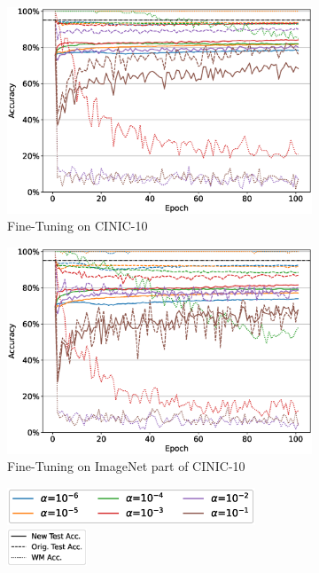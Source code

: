 \begin{figure}
\centering
\begin{subfigure}[b]{0.49\textwidth}
    \centering
    \includegraphics[width=\linewidth]{images/finetuning/finetuning_protecting_content_imagenet_0.eps}
    \caption{Fine-Tuning on CINIC-10}
\end{subfigure}
\begin{subfigure}[b]{0.49\textwidth}
    \centering
    \includegraphics[width=\linewidth]{images/finetuning/finetuning_protecting_content_imagenet_1.eps}
    \caption{Fine-Tuning on ImageNet part of CINIC-10}
\end{subfigure}

\begin{subfigure}[b]{\linewidth}
    \centering
    \includegraphics[height=1.1cm]{images/finetuning/legend_content_finetuning_imagenet_colors.eps}
    \quad
    \includegraphics[height=1.1cm]{images/finetuning/legend_content_finetuning_imagenet_linetypes.eps}
\end{subfigure}


\end{figure}
